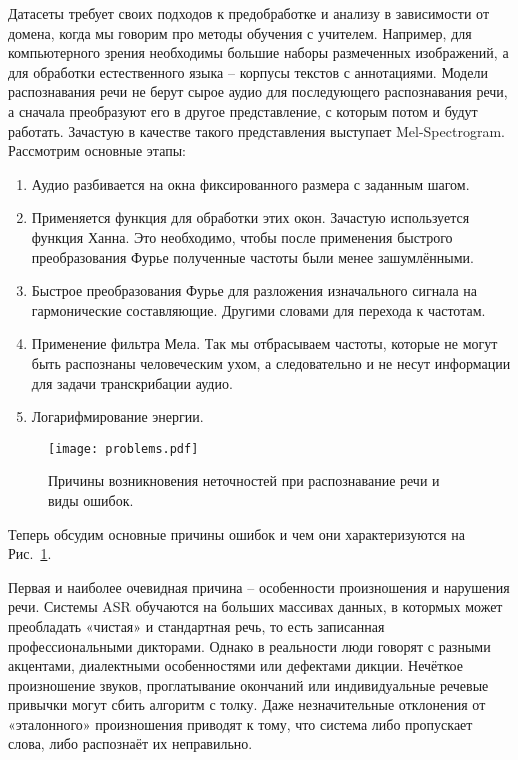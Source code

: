 Датасеты требует своих подходов к предобработке и анализу в зависимости от домена, когда мы говорим про методы обучения с учителем.
Например, для компьютерного зрения необходимы большие наборы размеченных изображений, а для обработки естественного языка -- корпусы текстов с аннотациями.
Модели распознавания речи не берут сырое аудио для последующего распознавания речи, а сначала преобразуют его в другое представление, с которым потом и будут работать\cite{hannun2014deep,amodei2016deep}.
Зачастую в качестве такого представления выступает Mel-Spectrogram.
Рассмотрим основные этапы:
\begin{enumerate}
  \item Аудио разбивается на окна фиксированного размера с заданным шагом.
  \item Применяется функция для обработки этих окон.
  Зачастую используется функция Ханна.
  Это необходимо, чтобы после применения быстрого преобразования Фурье полученные частоты были менее зашумлёнными.
  \item Быстрое преобразования Фурье\cite{Heideman1984} для разложения изначального сигнала на гармонические составляющие.
  Другими словами для перехода к частотам.
  \item Применение фильтра Мела.
  Так мы отбрасываем частоты, которые не могут быть распознаны человеческим ухом, а следовательно и не несут информации для задачи транскрибации аудио.
  \item Логарифмирование энергии.
\end{enumerate}

\begin{figure}[!t]
  \centering
  \texttt{[image: problems.pdf]}
  \caption{Причины возникновения неточностей при распознавание речи и виды ошибок.}
  \label{fig:problems}
\end{figure}

Теперь обсудим основные причины ошибок и чем они характеризуются на Рис.~\ref{fig:problems}.

Первая и наиболее очевидная причина -- особенности произношения и нарушения речи.
Системы ASR обучаются на больших массивах данных, в котормых может преобладать «чистая» и стандартная речь, то есть записанная профессиональными дикторами.
Однако в реальности люди говорят с разными акцентами, диалектными особенностями или дефектами дикции.
Нечёткое произношение звуков, проглатывание окончаний или индивидуальные речевые привычки могут сбить алгоритм с толку.
Даже незначительные отклонения от «эталонного» произношения приводят к тому, что система либо пропускает слова, либо распознаёт их неправильно.

